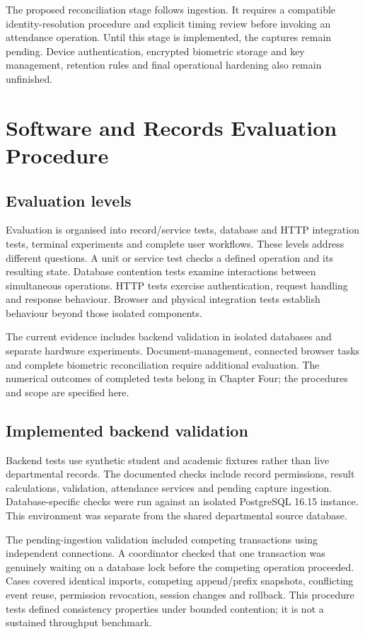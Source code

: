 The proposed reconciliation stage follows ingestion. It requires a compatible identity-resolution procedure and explicit timing review before invoking an attendance operation. Until this stage is implemented, the captures remain pending. Device authentication, encrypted biometric storage and key management, retention rules and final operational hardening also remain unfinished.

\section{Software and Records Evaluation Procedure}\label{sec:3-10}

\subsection{Evaluation levels}\label{sec:3-10-1}

Evaluation is organised into record/service tests, database and HTTP integration tests, terminal experiments and complete user workflows. These levels address different questions. A unit or service test checks a defined operation and its resulting state. Database contention tests examine interactions between simultaneous operations. HTTP tests exercise authentication, request handling and response behaviour. Browser and physical integration tests establish behaviour beyond those isolated components.

The current evidence includes backend validation in isolated databases and separate hardware experiments. Document-management, connected browser tasks and complete biometric reconciliation require additional evaluation. The numerical outcomes of completed tests belong in Chapter Four; the procedures and scope are specified here.

\subsection{Implemented backend validation}\label{sec:3-10-2}

Backend tests use synthetic student and academic fixtures rather than live departmental records. The documented checks include record permissions, result calculations, validation, attendance services and pending capture ingestion. Database-specific checks were run against an isolated PostgreSQL 16.15 instance. This environment was separate from the shared departmental source database.

The pending-ingestion validation included competing transactions using independent connections. A coordinator checked that one transaction was genuinely waiting on a database lock before the competing operation proceeded. Cases covered identical imports, competing append/prefix snapshots, conflicting event reuse, permission revocation, session changes and rollback. This procedure tests defined consistency properties under bounded contention; it is not a sustained throughput benchmark.

